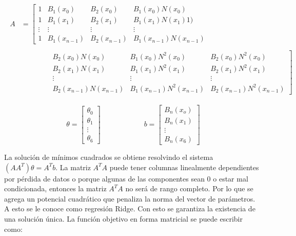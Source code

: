 \begin{eqnarray}
\begin{aligned}
A & =
\left[\begin{matrix}
 1 & B_{1}(x_{0}) & B_{2}(x_0) & B_{1}(x_{0})N(x_{0})\\
 1 & B_{1}(x_{1}) & B_{2}(x_1) & B_{1}(x_{1})N(x_{1}){1})\\
 \vdots & \vdots & \vdots & \vdots \\
 1 & B_{1}(x_{n-1}) & B_{2}(x_{n-1}) & B_{1}(x_{n-1})N(x_{n-1})
\end{matrix}\right.\\ \\
&\qquad\qquad
\left.\begin{matrix}
 B_{2}(x_{0})N(x_{0}) & B_{1}(x_{0})N^{2}(x_{0}) & B_{2}(x_{0})N^{2}(x_{0}) \\
 B_{2}(x_{1})N(x_{1}) & B_{1}(x_{1})N^{2}(x_{1}) & B_{2}(x_{1})N^{2}(x_{1}) \\
 \vdots & \vdots & \vdots\\
 B_{2}(x_{n-1})N(x_{n-1}) & B_{1}(x_{n-1})N^{2}(x_{n-1}) & B_{2}(x_{n-1})N^{2}(x_{n-1}) \nonumber 
\end{matrix}\right]
\end{aligned}
\end{eqnarray}

\begin{equation}
\theta = 
\begin{bmatrix}
\theta_{0} \\
\theta_{1} \\
\vdots \\
\theta_{6}
\end{bmatrix}
\qquad \qquad \qquad
b = 
\begin{bmatrix}
B_{n}(x_{o})\\
B_{n}(x_{1})\\
\vdots\\
B_{n}(x_{6}) \nonumber
\end{bmatrix}
\end{equation}

La solución de mínimos cuadrados se obtiene resolvindo el sistema $(AA^{T})\theta = A^{T}b$. La matriz $A^{T}A$ puede tener columnas linealmente dependientes por pérdida de datos o porque algunas de las componentes sean 0 o estar mal condicionada, entonces la matriz $A^{T}A$ no será de rango completo. Por lo que se agrega un potencial cuadrático que penaliza la norma del vector de parámetros. A esto se le conoce como regresión Ridge. Con esto se garantiza la existencia de una solución única. La función objetivo en forma matricial se puede escribir como: 


